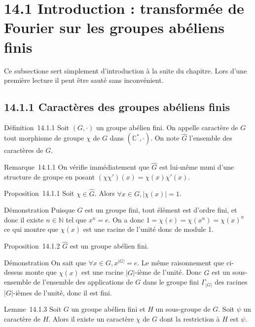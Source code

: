 \section{14.1 Introduction : transformée de Fourier sur les groupes abéliens finis}

Ce subsectione sert simplement d'introduction à la suite du chapitre.
Lors d'une première lecture il peut être sauté sans inconvénient.

\subsection{14.1.1 Caractères des groupes abéliens finis}

Définition~14.1.1 Soit $(G,\cdot)$ un groupe abélien fini. On appelle
caractère de $G$ tout morphisme de groupe $\chi$ de $G$ dans $(\mathbb{C}^*, \cdot)$.
On note $\hat{G}$ l'ensemble des caractères de $G$.

Remarque~14.1.1 On vérifie immédiatement que $\hat{G}$
est lui-même muni d'une structure de groupe en posant $(\chi \chi')(x) =
\chi(x)\chi'(x)$.

Proposition~14.1.1 Soit $\chi \in \hat{G}$. Alors
$\forall x \in G, |\chi(x)| = 1$.

Démonstration Puisque $G$ est un groupe fini, tout élément est d'ordre
fini, et donc il existe $n \in \mathbb{N}$ tel que $x^n = e$. On a donc $1 =
\chi(e) = \chi(x^n) = \chi(x)^n$ ce qui montre que $\chi(x)$ est
une racine de l'unité donc de module 1.

Proposition~14.1.2 $\hat{G}$ est un groupe abélien fini.

Démonstration On sait que $\forall x \in G,
x^{|G|} = e$. Le même raisonnement que ci-dessus monte que $\chi(x)$ est une racine $|G|$-ième de
l'unité. Donc $\hat{G}$ est un sous-ensemble de
l'ensemble des applications de $G$ dans le groupe fini
$\Gamma_{|G|}$ des racines $|G|$-ièmes
de l'unité, donc il est fini.

Lemme~14.1.3 Soit $G$ un groupe abélien fini et $H$ un sous-groupe de $G$.
Soit $\psi$ un caractère de $H$. Alors il existe un caractère $\chi$ de $G$ dont la
restriction à $H$ est $\psi$.

